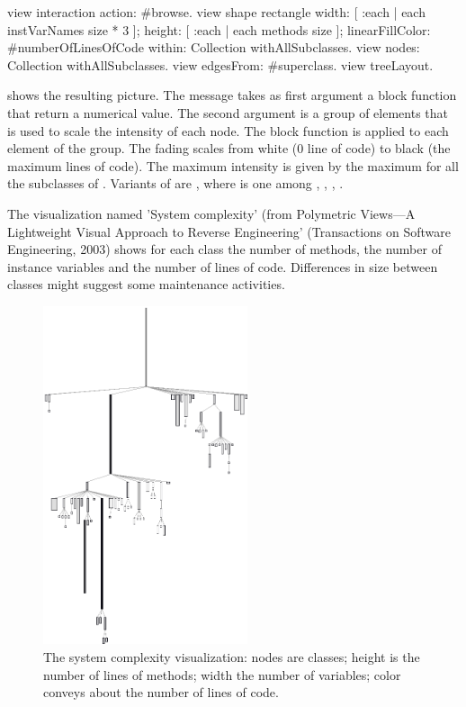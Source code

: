 \documentclass[a4paper,10pt,twoside]{book}
\begin{document}
\begin{code}{}
view interaction action: #browse.
view shape rectangle
	width: [ :each | each instVarNames size * 3 ];
	height: [ :each | each methods size ];
	linearFillColor: #numberOfLinesOfCode within: Collection withAllSubclasses.
view nodes: Collection withAllSubclasses.
view edgesFrom: #superclass.
view treeLayout.
\end{code}

 shows the resulting picture. The message  takes as first argument a block function that return a numerical value. The second argument is a group of elements that is used to scale the intensity of each node. The block function is applied to each element of the group. The fading scales from white (0 line of code) to black (the maximum lines of code). The maximum intensity is given by the maximum  for all the subclasses of . 
Variants of  are , where  is one among , , , .

The visualization named 'System complexity' (from Polymetric Views---A Lightweight Visual Approach to Reverse Engineering' (Transactions on Software Engineering, 2003) shows for each class the number of methods, the number of instance variables and the number of lines of code. Differences in size between classes might suggest some maintenance activities. 

\begin{figure}[htbp]
\centerline{\includegraphics[width=6cm]{systemComplexity}}
\caption{The system complexity visualization: nodes are classes; height is the number of lines of methods; width the number of variables; color conveys about the number of lines of code.}
\label{fig:systemComplexity}
\end{figure}
\end{document}

